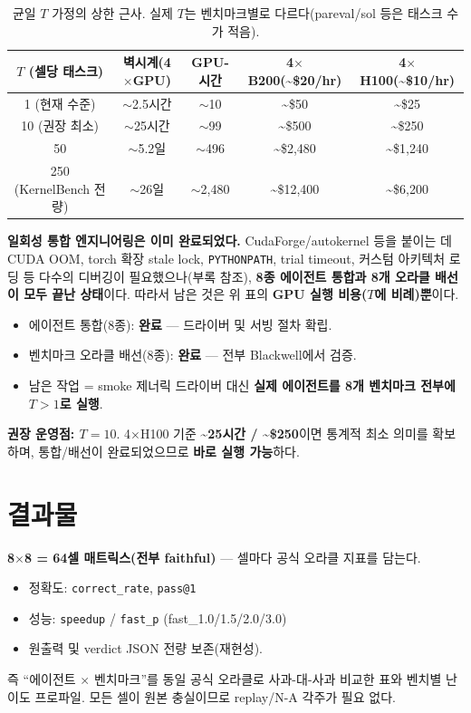 \documentclass[11pt]{article}
\newcommand{\code}[1]{\texttt{\small #1}}
\begin{document}
\begin{table}[h]
\centering
\begin{tabular}{@{}ccccc@{}}
\toprule
\textbf{$T$ (셀당 태스크)} & \textbf{벽시계(4$\times$GPU)} & \textbf{GPU-시간} & \textbf{4$\times$B200(\textasciitilde\$20/hr)} & \textbf{4$\times$H100(\textasciitilde\$10/hr)} \\
\midrule
1 (현재 수준)        & $\sim$2.5시간 & $\sim$10   & \textasciitilde\$50    & \textasciitilde\$25 \\
10 (권장 최소)       & $\sim$25시간  & $\sim$99   & \textasciitilde\$500   & \textasciitilde\$250 \\
50                   & $\sim$5.2일   & $\sim$496  & \textasciitilde\$2{,}480 & \textasciitilde\$1{,}240 \\
250 (KernelBench 전량) & $\sim$26일   & $\sim$2{,}480 & \textasciitilde\$12{,}400 & \textasciitilde\$6{,}200 \\
\bottomrule
\end{tabular}
\caption{균일 $T$ 가정의 상한 근사. 실제 $T$는 벤치마크별로 다르다(pareval/sol 등은 태스크 수가 적음).}
\end{table}

\noindent\textbf{일회성 통합 엔지니어링은 이미 완료되었다.} CudaForge/autokernel 등을 붙이는 데
CUDA OOM, torch 확장 stale lock, \code{PYTHONPATH}, trial timeout, 커스텀 아키텍처 로딩 등 다수의
디버깅이 필요했으나(부록 참조), \textbf{8종 에이전트 통합과 8개 오라클 배선이 모두 끝난 상태}이다.
따라서 남은 것은 위 표의 \textbf{GPU 실행 비용($T$에 비례)뿐}이다.
\begin{itemize}
  \item 에이전트 통합(8종): \textbf{완료} --- 드라이버 및 서빙 절차 확립.
  \item 벤치마크 오라클 배선(8종): \textbf{완료} --- 전부 Blackwell에서 검증.
  \item 남은 작업 = smoke 제너릭 드라이버 대신 \textbf{실제 에이전트를 8개 벤치마크 전부에 $T{>}1$로 실행}.
\end{itemize}
\textbf{권장 운영점: $T=10$}. 4$\times$H100 기준 \textbf{\textasciitilde 25시간 / \textasciitilde \$250}이면
통계적 최소 의미를 확보하며, 통합/배선이 완료되었으므로 \textbf{바로 실행 가능}하다.

\section{결과물}
\textbf{8$\times$8 = 64셀 매트릭스(전부 faithful)} --- 셀마다 공식 오라클 지표를 담는다.
\begin{itemize}
  \item 정확도: \code{correct\_rate}, \code{pass@1}
  \item 성능: \code{speedup} / \code{fast\_p} (fast\_1.0/1.5/2.0/3.0)
  \item 원출력 및 verdict JSON 전량 보존(재현성).
\end{itemize}
즉 ``에이전트 $\times$ 벤치마크''를 동일 공식 오라클로 사과-대-사과 비교한 표와 벤치별 난이도 프로파일.
모든 셀이 원본 충실이므로 replay/N-A 각주가 필요 없다.
\end{document}
